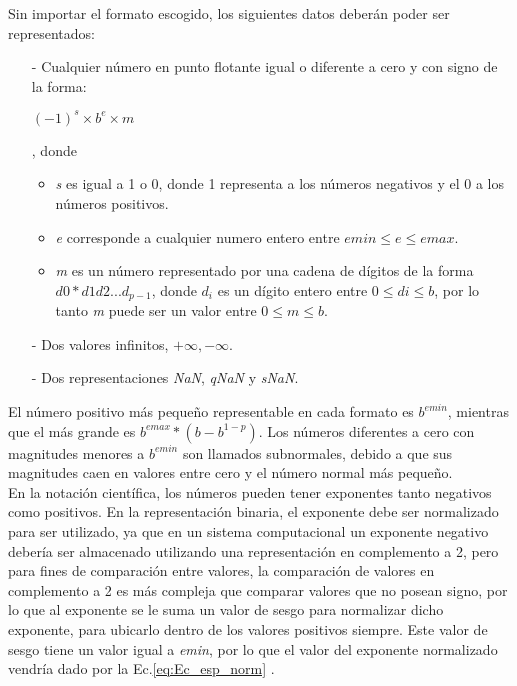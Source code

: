 Sin importar el formato escogido, los siguientes datos deberán poder ser representados:

\begin{itemize}
	\item[-]	Cualquier número en punto flotante igual o diferente a cero y con signo de la forma:
	\begin{center} $(-1)^{s} \times b^{e} \times m $ \end{center}, donde
	\begin{itemize}
		\item	\textit{s} es igual a 1 o 0, donde 1 representa a los números negativos y el 0 a los números positivos.
		\item	\textit{e} corresponde a cualquier numero entero entre $emin \leq e \leq emax$.
		\item	\textit{m} es un número representado por una cadena de dígitos de la forma $ d0*d1d2...d_{p-1} $, donde $ d_{i} $ es un dígito entero entre $ 0 \leq di \leq b $, por lo tanto \textit{m} puede ser un valor  entre $ 0 \leq m \leq b $.
		
	\end{itemize}
	\item[-]	Dos valores infinitos, $ +\infty,-\infty $.
	\item[-]	Dos representaciones \textit{NaN}, \textit{qNaN} y \textit{sNaN}.
\end{itemize}

El número positivo más pequeño representable en cada formato es $b^{emin}$, mientras que el más grande es $b^{emax}*(b-b^{1-p})$. Los números diferentes a cero con magnitudes menores a $b^{emin}$ son llamados subnormales, debido a que sus magnitudes caen en valores entre cero y el número normal más pequeño.\\

En la notación científica, los números pueden tener exponentes tanto negativos como positivos. En la representación binaria, el exponente debe ser  normalizado para ser utilizado, ya que en un sistema computacional un exponente negativo debería ser almacenado utilizando una representación en complemento a 2, pero para fines de comparación entre valores, la comparación de valores en complemento a 2 es más compleja que comparar valores que no posean signo, por lo que al exponente se le suma un valor de sesgo para normalizar dicho exponente, para ubicarlo dentro de los valores positivos siempre. Este valor de sesgo tiene un valor igual a \textit{emin}, por lo que el valor del exponente normalizado vendría dado por la Ec.\ref{eq:Ec_esp_norm}  \cite{Tesis_Diego}.\\


